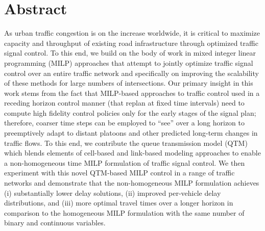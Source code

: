 \section*{Abstract}



As urban traffic congestion is on the increase worldwide, it is
critical to maximize capacity and throughput of existing road
infrastructure through optimized traffic signal control.  To this end,
we build on the body of work in mixed integer linear programming
(MILP) approaches that attempt to jointly optimize traffic signal
control over an entire traffic network and specifically on
improving the scalability of these methods for large numbers of
intersections.  Our primary insight in this work stems from the fact
that MILP-based approaches to traffic control used in a receding
horizon control manner (that replan at fixed time intervals) need to
compute high fidelity control policies only for the early stages of
the signal plan; therefore, coarser time steps can be employed to
``see'' over a long horizon to preemptively adapt to distant platoons
and other predicted long-term changes in traffic flows.  To this end,
we contribute the queue transmission model (QTM) which blends elements
of cell-based and link-based modeling approaches to enable a
non-homogeneous time MILP formulation of traffic signal control.
%
We then experiment with this novel QTM-based MILP control in a range
of traffic networks and demonstrate that the non-homogeneous MILP
formulation achieves (i) substantially lower delay solutions, (ii)
improved per-vehicle delay distributions, and (iii) more optimal travel
times over a longer horizon in comparison to the homogeneous MILP
formulation with the same number of binary and continuous variables.

%
%
%

%


%
